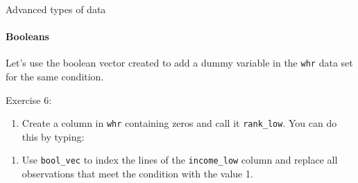 \documentclass[ignorenonframetext,]{beamer}
\newenvironment{Shaded}{\begin{snugshade}}{\end{snugshade}}
\newcommand{\DecValTok}[1]{\textcolor[rgb]{0.00,0.00,0.81}{#1}}
\newcommand{\StringTok}[1]{\textcolor[rgb]{0.31,0.60,0.02}{#1}}
\newcommand{\OperatorTok}[1]{\textcolor[rgb]{0.81,0.36,0.00}{\textbf{#1}}}
\newcommand{\NormalTok}[1]{#1}
\providecommand{\tightlist}{%
  \setlength{\itemsep}{0pt}\setlength{\parskip}{0pt}}
\begin{document}
\begin{frame}[fragile]{Advanced types of data}

\framesubtitle{Booleans}

Let's use the boolean vector created to add a dummy variable in the
\texttt{whr} data set for the same condition.

\begin{block}{Exercise 6:}

\begin{enumerate}
\def\labelenumi{\arabic{enumi}.}
\tightlist
\item
  Create a column in \texttt{whr} containing zeros and call it
  \texttt{rank\_low}. You can do this by typing:
\end{enumerate}

\begin{Shaded}
\end{Shaded}

\begin{enumerate}
\def\labelenumi{\arabic{enumi}.}
\setcounter{enumi}{1}
\tightlist
\item
  Use \texttt{bool\_vec} to index the lines of the \texttt{income\_low}
  column and replace all observations that meet the condition with the
  value 1.
\end{enumerate}

\begin{Shaded}
\end{Shaded}

\end{block}

\end{frame}
\end{document}
